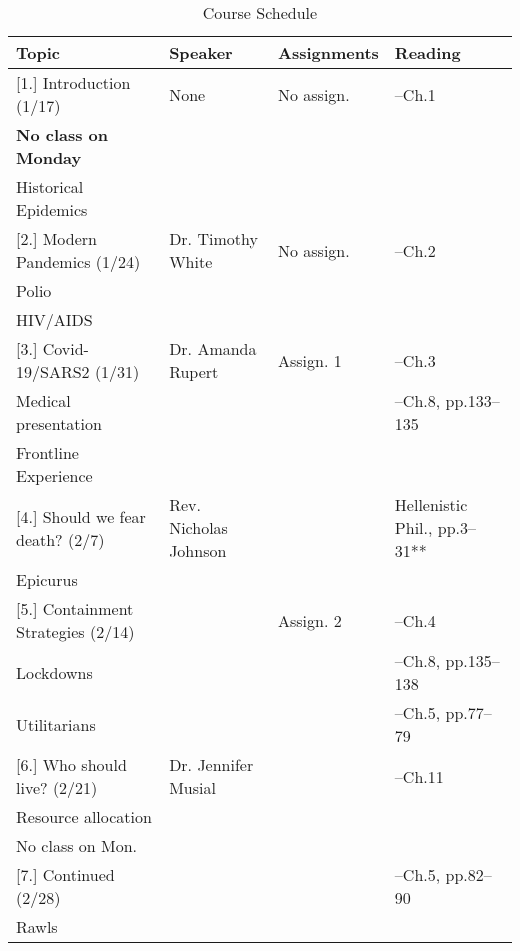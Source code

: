 \documentclass[article,oneside]{memoir}
\begin{document}
\begin{landscape}
\begin{center}
\begin{longtable}{p{6cm}p{4cm}p{6cm}p{4cm}}
 
  \caption{Course Schedule} \\
  \toprule
  \textbf{Topic}   & \textbf{Speaker} & \textbf{Assignments} & \textbf{Reading} \\
  \midrule

  
[1.] Introduction (1/17) 		& None				& No assign.		&  --Ch.1 \\ 
\textbf{No class on Monday}	&					&				&   \\
Historical Epidemics			&					&				& \\
[1.8\baselineskip] \hline


[2.] Modern Pandemics (1/24)	  & Dr. Timothy White 	 &  No assign.	& --Ch.2\\
Polio 					  &	 	&			 &  \\ 
HIV/AIDS					  &	 	& 	 		& \\ [1.8\baselineskip] \hline



[3.] Covid-19/SARS2 (1/31)	& Dr. Amanda Rupert 	& Assign. 1	& --Ch.3   \\ 
Medical presentation			&					& & --Ch.8, pp.133--135  \\ 
Frontline Experience			&					&  & \\[1.8\baselineskip]  \hline 

[4.] Should we fear death? (2/7) & Rev. Nicholas Johnson	 &     	 &  Hellenistic Phil., pp.3–31** \\
Epicurus					 & 					 & 	 &  \\ [1.8\baselineskip]  \hline %


[5.] Containment Strategies (2/14)	& 			& Assign. 2 	&  --Ch.4  \\
Lockdowns			    	    	& 			&			&  --Ch.8, pp.135--138  \\ 
Utilitarians		    	    			& 			&			&  --Ch.5, pp.77--79 \\  [1.8\baselineskip]  \hline 

[6.] Who should live?  (2/21)	   	&  Dr. Jennifer Musial		&      &  --Ch.11 \\
Resource allocation				&						&	&	 \\
No class on Mon.			     	& 						&	&  	 \\ [1.8\baselineskip]  \hline 

[7.] Continued (2/28)				& 			& 		&  --Ch.5, pp.82--90 \\
Rawls						& 			&	  			& \\  [1.8\baselineskip]  \hline


\end{longtable}
\end{center}
\end{landscape}
\end{document}

